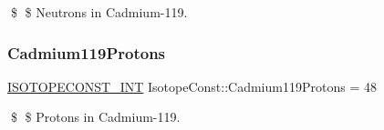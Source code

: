 \$ \$ Neutrons in Cadmium-\/119. \mbox{\label{group___isotope_const-_cadmium-_cd119_ga161d3486d59aab7617607dba9b98c9e2}} 
\subsubsection{\texorpdfstring{Cadmium119\+Protons}{Cadmium119Protons}}
{\footnotesize\ttfamily \mbox{\hyperlink{group___isotope_const-_macros_ga5f18360b3e99483a35c32d789e62621c}{I\+S\+O\+T\+O\+P\+E\+C\+O\+N\+S\+T\+\_\+\+I\+NT}} Isotope\+Const\+::\+Cadmium119\+Protons = 48}

\$ \$ Protons in Cadmium-\/119. 